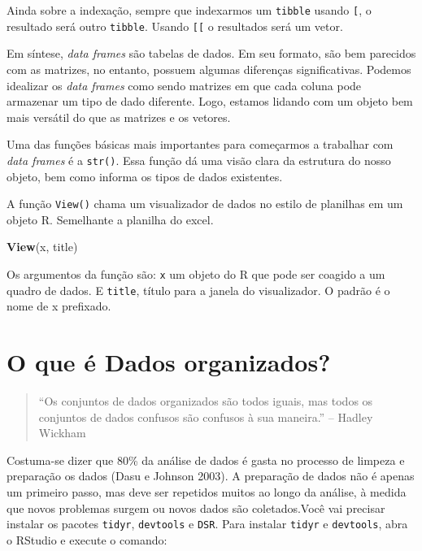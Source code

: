 \documentclass[]{book}
\newenvironment{Shaded}{\begin{snugshade}}{\end{snugshade}}
\newcommand{\KeywordTok}[1]{\textcolor[rgb]{0.13,0.29,0.53}{\textbf{#1}}}
\newcommand{\NormalTok}[1]{#1}
\begin{document}
Ainda sobre a indexação, sempre que indexarmos um \texttt{tibble} usando \texttt{{[}}, o resultado será outro \texttt{tibble}. Usando \texttt{{[}{[}} o resultados será um vetor.

Em síntese, \emph{data frames} são tabelas de dados. Em seu formato, são bem parecidos com as matrizes, no entanto, possuem algumas diferenças significativas. Podemos idealizar os \emph{data frames} como sendo matrizes em que cada coluna pode armazenar um tipo de dado diferente. Logo, estamos lidando com um objeto bem mais versátil do que as matrizes e os vetores.

Uma das funções básicas mais importantes para começarmos a trabalhar com \emph{data frames} é a \texttt{str()}. Essa função dá uma visão clara da estrutura do nosso objeto, bem como informa os tipos de dados existentes.

A função \texttt{View()} chama um visualizador de dados no estilo de planilhas em um objeto R. Semelhante a planilha do excel.

\begin{Shaded}
\begin{Highlighting}[]
\KeywordTok{View}\NormalTok{(x, title)}
\end{Highlighting}
\end{Shaded}

Os argumentos da função são: \texttt{x} um objeto do R que pode ser coagido a um quadro de dados. E \texttt{title}, título para a janela do visualizador. O padrão é o nome de x prefixado.

\hypertarget{o-que-uxe9-dados-organizados}{%
\section{O que é Dados organizados?}\label{o-que-uxe9-dados-organizados}}

\begin{quote}
``Os conjuntos de dados organizados são todos iguais, mas todos os conjuntos de dados confusos são confusos à sua maneira.'' -- Hadley Wickham
\end{quote}

Costuma-se dizer que 80\% da análise de dados é gasta no processo de limpeza e preparação os dados (Dasu e Johnson 2003). A preparação de dados não é apenas um primeiro passo, mas deve ser repetidos muitos ao longo da análise, à medida que novos problemas surgem ou novos dados são coletados.Você vai precisar instalar os pacotes \texttt{tidyr}, \texttt{devtools} e \texttt{DSR}. Para instalar \texttt{tidyr} e \texttt{devtools}, abra o RStudio e execute o comando:
\end{document}
